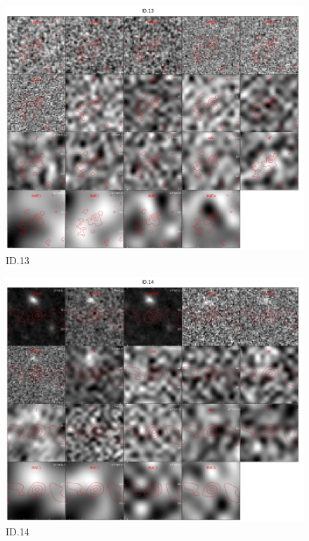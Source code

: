 \begin{figure}[tbp]
\centering \includegraphics[width=160mm]{Matched/ASPECS_Cutout_12.jpg}
\caption{ID.13}
\label{fig:Match_Three}
\end{figure}

\begin{figure}[tbp]
\centering \includegraphics[width=160mm]{Matched/ASPECS_Cutout_13.jpg}
\caption{ID.14}
\label{fig:Match_Three}
\end{figure}

